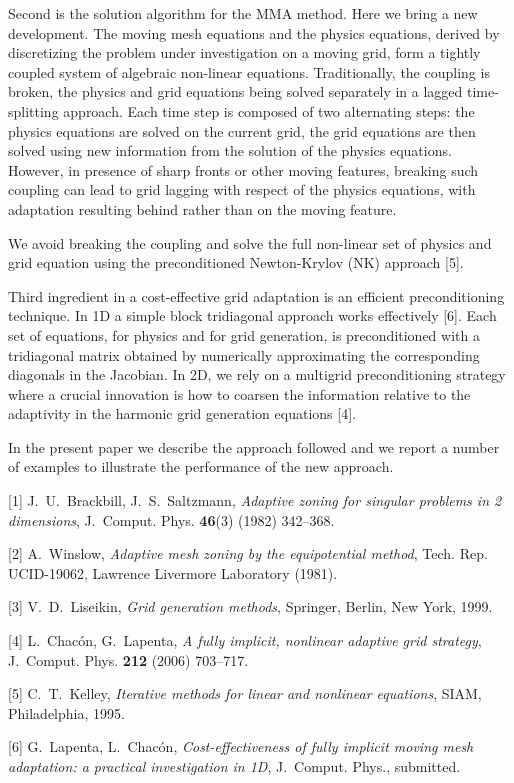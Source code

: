 \documentclass{report}
\begin{document}
Second is the solution
algorithm for the MMA method. Here we bring a new
development. The moving mesh equations and the physics
equations, derived by discretizing the problem under
investigation on a moving grid, form a tightly coupled
system of algebraic non-linear equations. Traditionally, the
coupling is broken, the physics and grid equations being
solved separately in a lagged time-splitting approach. Each
time step is composed of two alternating steps: the physics
equations are solved on the current grid, the grid equations
are then solved using new information from the solution of
the physics equations. However, in presence of sharp fronts
or other moving features, breaking such coupling can lead to
grid lagging with respect of the physics equations, with
adaptation resulting behind rather than on the moving
feature.

 We avoid breaking the coupling and solve the
full non-linear set of physics and grid equation using the
preconditioned Newton-Krylov (NK) approach [5].

Third
ingredient in a cost-effective grid adaptation is an
efficient preconditioning technique. In 1D a simple block
tridiagonal approach works effectively [6]. Each set of
equations, for physics and for grid generation, is
preconditioned with a tridiagonal matrix obtained by
numerically approximating the corresponding diagonals in the
Jacobian. In 2D, we rely on a multigrid preconditioning
strategy where a crucial innovation is how to coarsen the
information relative to the adaptivity in the harmonic grid
generation equations [4].

In the present paper we
describe the approach followed and we report a number of
examples to illustrate the performance of the new approach.

[1] J.~U.~Brackbill, J.~S.~Saltzmann,
{\em Adaptive zoning for singular problems in 2 dimensions},
J.~Comput. Phys. {\bf 46}(3) (1982) 342--368.

[2] A.~Winslow,
{\em Adaptive mesh zoning by the equipotential method},
Tech. Rep. UCID-19062, Lawrence Livermore Laboratory (1981).

[3] V.~D.~Liseikin,
{\em Grid generation methods}, Springer, Berlin, New York, 1999.


[4] L.~Chac\'{o}n, G.~Lapenta,
{\em A fully implicit, nonlinear adaptive grid strategy},
J.~Comput. Phys. {\bf 212} (2006) 703--717.

[5] C.~T.~Kelley,
{\em Iterative methods for linear and nonlinear equations},
SIAM, Philadelphia, 1995.


[6] G.~Lapenta, L.~Chac\'{o}n,
{\em Cost-effectiveness of fully implicit moving mesh
adaptation: a practical investigation in 1D},
J.~Comput. Phys., submitted.



\end{document}
